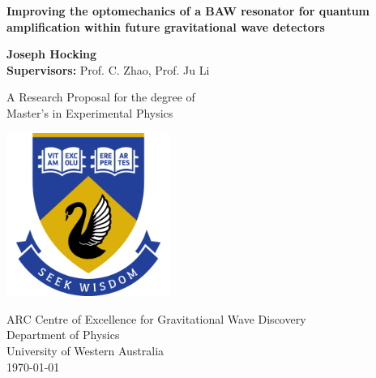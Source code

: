 \documentclass[aps,
                pra,  
                a4paper, 
                amsmath, 
                amssymb, 
                preprint,
                amsfonts,
                nofootinbib,
                titlepage
            ]{revtex4-2}
\begin{document}

\begin{titlepage}
    \begin{center}
            
        \Large
        \textbf{Improving the optomechanics of a BAW resonator for quantum amplification within future gravitational wave detectors}
            
            
        \vspace{1.5cm}
        
        \large
        \textbf{Joseph Hocking}\\
        \vspace{0.25cm}
        \textbf{Supervisors:} Prof. C. Zhao, Prof. Ju Li
            
        \vfill
            
        A Research Proposal for the degree of\\
        Master's in Experimental Physics
            
        \vspace{0.8cm}
            
        \includegraphics[width=0.4\textwidth]{img/uwa-logo.png}
            
        \large
        ARC Centre of Excellence for Gravitational Wave Discovery\\
        Department of Physics\\
        University of Western Australia\\
        \today
            
    \end{center}
\end{titlepage}
\end{document}

